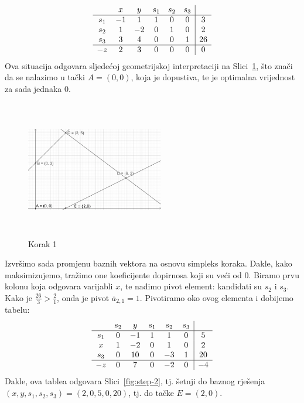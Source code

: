 \documentclass[a4paper, utf8, 11pt, colorlinks]{book}
\begin{document}
$$\begin{array}{cccccc| c}
        & x & y & s_1 & s_2 & s_3 & \\ \hline
   s_1  & -1 & 1 & 1 & 0 & 0 & 3 \\
   s_2  & 1 & -2 & 0 & 1 & 0 & 2 \\
   s_3  & 3 & 4 & 0 & 0 & 1 & 26 \\ \hline
    -z  & 2 & 3 & 0 & 0 & 0 & 0 \\
\end{array}
$$ 
Ova situacija odgovara sljedećoj geometrijskoj interpretaciji na Slici~\ref{fig:step-1}, što znači da se nalazimo u tački $A=(0,0)$, koja je dopustiva, te je optimalna vrijednost za sada jednaka 0. 
\begin{figure}[H]
	\centering
	\includegraphics[width=170pt, height=170pt]{simpleks-primjer-2-sl1.eps}
	\caption{Korak 1}
	\label{fig:step-1}
\end{figure}

Izvršimo sada promjenu baznih vektora na osnovu simpleks koraka. Dakle, kako maksimizujemo, 
tražimo one koeficijente dopirnosa koji su veći od 0. Biramo prvu kolonu koja odgovara varijabli $x$, te nađimo 
pivot element: kandidati su $s_2$ i $s_3$. Kako je $\frac{26}{3} > \frac{2}{1}$, onda je  pivot $\overline{a}_{2, 1} = 1$. Pivotiramo oko ovog elementa i dobijemo tabelu:
$$\begin{array}{cccccc| c}
       & s_2  & y  & s_1  & s_2 & s_3 &    \\ \hline
   s_1 & 0    & -1  & 1  & 1 & 0  &  5     \\
   x   & 1    & -2  & 0  & 1 & 0  &  2     \\
   s_3 & 0    & 10   &  0  & -3 & 1 & 20   \\ \hline
   -z  & 0    &  7   & 0   & -2 & 0 & -4   \\ 
\end{array}
$$ 
Dakle, ova tablea odgovara Slici~\ref{fig:step-2}, tj. šetnji do baznog rješenja $(x,y, s_1, s_2, s_3)=(2, 0, 5, 0 ,20)$, tj. do tačke $E=(2, 0)$. 
\end{document}
